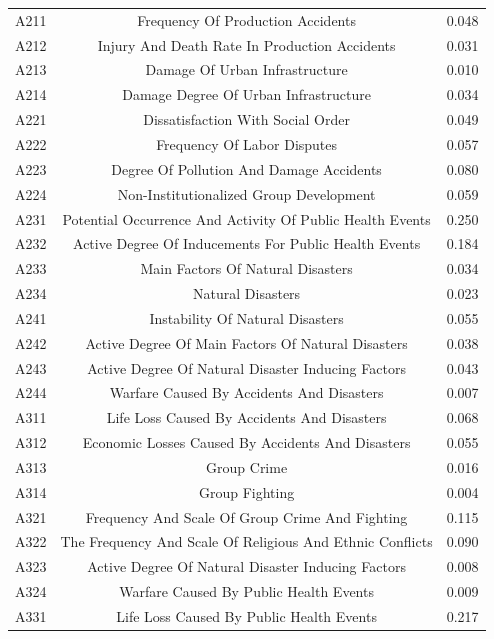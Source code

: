 \documentclass[12pt]{article}  %
\begin{document}
\begin{table}[ht]
{\begin{tabular}{ccc}
        A211 & Frequency Of Production Accidents&0.048  \\ 
        A212 & Injury And Death Rate In Production Accidents&0.031  \\ 
        A213 & Damage Of Urban Infrastructure&0.010 \\ 
        A214 & Damage Degree Of Urban Infrastructure &0.034 \\ 
        A221 & Dissatisfaction With Social Order &0.049 \\ 
        A222 & Frequency Of Labor Disputes &0.057 \\ 
        A223 & Degree Of Pollution And Damage Accidents &0.080 \\ 
        A224 & Non-Institutionalized Group Development &0.059 \\ 
        A231 & Potential Occurrence And Activity Of Public Health Events &0.250 \\ 
        A232 & Active Degree Of Inducements For Public Health Events &0.184 \\ 
        A233 & Main Factors Of Natural Disasters &0.034\\ 
        A234 & Natural Disasters &0.023\\ 
        A241 & Instability Of Natural Disasters &0.055 \\ 
        A242 & Active Degree Of Main Factors Of Natural Disasters  &0.038\\ 
        A243 & Active Degree Of Natural Disaster Inducing Factors  &0.043\\ 
        A244 & Warfare Caused By Accidents And Disasters &0.007 \\ 
        A311 & Life Loss Caused By Accidents And Disasters &0.068 \\ 
        A312 & Economic Losses Caused By Accidents And Disasters  &0.055\\ 
        A313 & Group Crime &0.016 \\ 
        A314 & Group Fighting  &0.004\\ 
        A321 & Frequency And Scale Of Group Crime And Fighting&0.115  \\ 
        A322 & The Frequency And Scale Of Religious And Ethnic Conflicts &0.090 \\ 
        A323 & Active Degree Of Natural Disaster Inducing Factors  &0.008\\ 
        A324 & Warfare Caused By Public Health Events &0.009 \\ 
        A331 & Life Loss Caused By Public Health Events &0.217\\ 

\end{tabular}}
\end{table}
\end{document}
